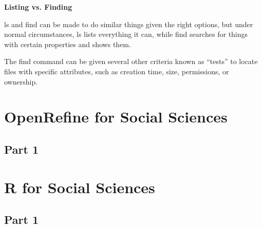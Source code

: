 \documentclass{article}
\begin{document}
\textbf{Listing vs. Finding}

ls and find can be made to do similar things given the right options, but under normal circumstances, ls lists everything it can, while find searches for things with certain properties and shows them.

The find command can be given several other criteria known as “tests” to locate files with specific attributes, such as creation time, size, permissions, or ownership. 




\section{OpenRefine for Social Sciences}
\subsection{Part 1}


\section{R for Social Sciences}
\subsection{Part 1}
\end{document}
